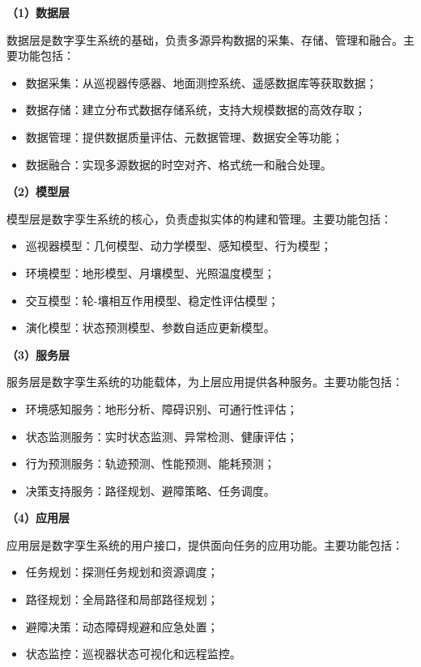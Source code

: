 \textbf{（1）数据层}

数据层是数字孪生系统的基础，负责多源异构数据的采集、存储、管理和融合。主要功能包括：
\begin{itemize}
    \item 数据采集：从巡视器传感器、地面测控系统、遥感数据库等获取数据；
    \item 数据存储：建立分布式数据存储系统，支持大规模数据的高效存取；
    \item 数据管理：提供数据质量评估、元数据管理、数据安全等功能；
    \item 数据融合：实现多源数据的时空对齐、格式统一和融合处理。
\end{itemize}

\textbf{（2）模型层}

模型层是数字孪生系统的核心，负责虚拟实体的构建和管理。主要功能包括：
\begin{itemize}
    \item 巡视器模型：几何模型、动力学模型、感知模型、行为模型；
    \item 环境模型：地形模型、月壤模型、光照温度模型；
    \item 交互模型：轮-壤相互作用模型、稳定性评估模型；
    \item 演化模型：状态预测模型、参数自适应更新模型。
\end{itemize}

\textbf{（3）服务层}

服务层是数字孪生系统的功能载体，为上层应用提供各种服务。主要功能包括：
\begin{itemize}
    \item 环境感知服务：地形分析、障碍识别、可通行性评估；
    \item 状态监测服务：实时状态监测、异常检测、健康评估；
    \item 行为预测服务：轨迹预测、性能预测、能耗预测；
    \item 决策支持服务：路径规划、避障策略、任务调度。
\end{itemize}

\textbf{（4）应用层}

应用层是数字孪生系统的用户接口，提供面向任务的应用功能。主要功能包括：
\begin{itemize}
    \item 任务规划：探测任务规划和资源调度；
    \item 路径规划：全局路径和局部路径规划；
    \item 避障决策：动态障碍规避和应急处置；
    \item 状态监控：巡视器状态可视化和远程监控。
\end{itemize}

